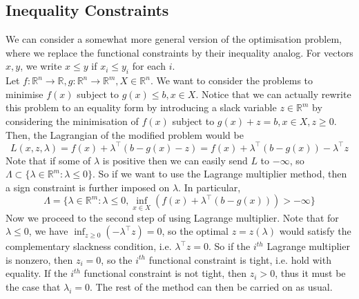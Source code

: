 \subsection{Inequality Constraints}
We can consider a somewhat more general version of the optimisation problem, where we replace the functional constraints by their inequality analog.
For vectors $x,y$, we write $x\le y$ if $x_i\le y_i$ for each $i$.\\
Let $f:\mathbb R^n\to\mathbb R,g:\mathbb R^n\to\mathbb R^m,X\in\mathbb R^n$.
We want to consider the problems to minimise $f(x)$ subject to $g(x)\le b,x\in X$.
Notice that we can actually rewrite this problem to an equality form by introducing a slack variable $z\in\mathbb R^m$ by considering the minimisation of $f(x)$ subject to $g(x)+z=b,x\in X,z\ge 0$.\\
Then, the Lagrangian of the modified problem would be
$$L(x,z,\lambda)=f(x)+\lambda^\top(b-g(x)-z)=f(x)+\lambda^\top(b-g(x))-\lambda^\top z$$
Note that if some of $\lambda$ is positive then we can easily send $L$ to $-\infty$, so $\Lambda\subset\{\lambda\in\mathbb R^m:\lambda\le 0\}$.
So if we want to use the Lagrange multiplier method, then a sign constraint is further imposed on $\lambda$.
In particular,
$$\Lambda=\{\lambda\in\mathbb R^m:\lambda\le 0,\inf_{x\in X}(f(x)+\lambda^\top(b-g(x)))>-\infty\}$$
Now we proceed to the second step of using Lagrange multiplier.
Note that for $\lambda\le 0$, we have $\inf_{z\ge 0}(-\lambda^\top z)=0$, so the optimal $z=z(\lambda)$ would satisfy the complementary slackness condition, i.e. $\lambda^\top z=0$.
So if the $i^{th}$ Lagrange multiplier is nonzero, then $z_i=0$, so the $i^{th}$ functional constraint is tight, i.e. hold with equality.
If the $i^{th}$ functional constraint is not tight, then $z_i>0$, thus it must be the case that $\lambda_i=0$.
The rest of the method can then be carried on as usual.
